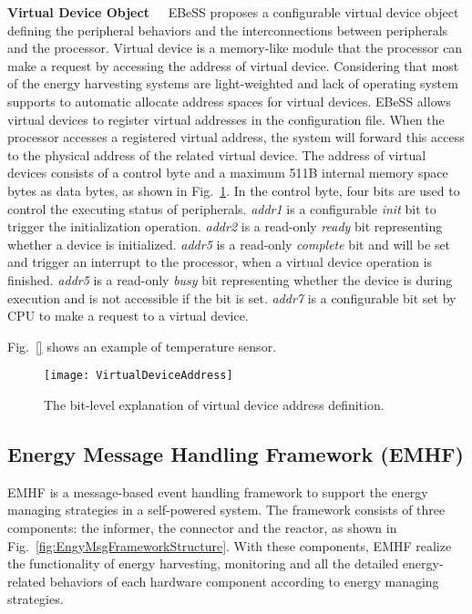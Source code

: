 \textbf{Virtual Device Object\ \ }
EBeSS proposes a configurable virtual device object defining the peripheral behaviors and the interconnections between peripherals and the processor.
Virtual device is a memory-like module that the processor can make a request by accessing the address of virtual device. 
Considering that most of the energy harvesting systems are light-weighted and lack of operating system supports to automatic allocate address spaces for virtual devices.
EBeSS allows virtual devices to register virtual addresses in the configuration file.
When the processor accesses a registered virtual address, the system will forward this access to the physical address of the related virtual device.
The address of virtual devices consists of a control byte and a maximum 511B internal memory space bytes as data bytes, as shown in Fig.~\ref{fig:VirtualDeviceAddress}.
In the control byte, four bits are used to control the executing status of peripherals.
\emph{addr1} is a configurable \emph{init} bit to trigger the initialization operation.
\emph{addr2} is a read-only \emph{ready} bit representing whether a device is initialized.
\emph{addr5} is a read-only \emph{complete} bit and will be set and trigger an interrupt to the processor, when a virtual device operation is finished.
\emph{addr5} is a read-only \emph{busy} bit representing whether the device is during execution and is not accessible if the bit is set.
\emph{addr7} is a configurable bit set by CPU to make a request to a virtual device.

Fig.~\ref{} shows an example of temperature sensor. 


\begin{figure}[!htpb]
	\centering
	\vspace{-5pt}
	\texttt{[image: VirtualDeviceAddress]}
	\vspace{-5pt}
	\caption{The bit-level explanation of virtual device address definition.}	\label{fig:VirtualDeviceAddress}
\end{figure}

\subsection{Energy Message Handling Framework (EMHF)}	\label{sec:tech-EMHF}
EMHF is a message-based event handling framework to support the energy managing strategies in a self-powered system.
The framework consists of three components: the informer, the connector and the reactor, as shown in Fig.~\ref{fig:EngyMsgFrameworkStructure}. 
With these components, EMHF realize the functionality of energy harvesting, monitoring and all the detailed energy-related behaviors of each hardware component according to energy managing strategies.

